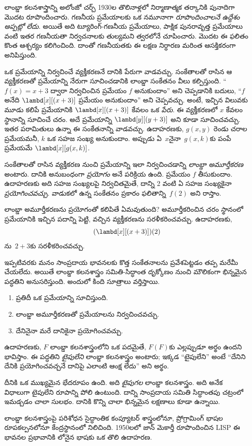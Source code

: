 \documentclass[../../../include/open-logic-section]{subfiles}
\begin{document}

లాంబ్డా కలనశాస్త్రాన్ని అలోంజో చర్చ్ 1930ల తొలినాళ్లలో నిర్మాణాత్మక
తర్కానికి పునాదిగా మొదట రూపొందించారు. గణనీయ ప్రమేయాలకు ఒక నమూనాగా
\emph{రూపొందించాలనే ఉద్దేశం అప్పట్లో లేదు}. అయితే అది ట్యూరింగ్-గణనీయ
ప్రమేయాలు, పాక్షిక పునరావృత్త ప్రమేయాలు వంటి ఇతర గణనీయతా నిర్వచనాలకు
తుల్యమని త్వరలోనే చూపించారు. మొదట ఈ ఫలితం కొంత ఆశ్చర్యం కలిగించింది.
దాంతో గణనీయతకు ఈ లక్షణ నిర్ధారణ మరింత ఆసక్తికరంగా అనిపిస్తుంది.

ఒక ప్రమేయాన్ని నిర్వచించే వ్యక్తీకరణనే దానికి పేరుగా వాడవచ్చు.
సంకేతాలతో రాసిన ఆ వ్యక్తీకరణతో ప్రమేయాన్ని నేరుగా సూచించడానికి
లాంబ్డా సంకేతనం వీలు కల్పిస్తుంది. ``$f(x) = x + 3$ ద్వారా నిర్వచించిన ప్రమేయం $f$ అనుకుందాం''
అని చెప్పడానికి బదులు, ``$f$ అనేది $\lambd[x][(x + 3)]$ ప్రమేయం
అనుకుందాం'' అని చెప్పవచ్చు. అంటే, ఇచ్చిన విలువకు మూడు కలిపే ప్రమేయానికి $\lambd[x][(x+3)]$ కేవలం ఒక \emph{పేరు}.
ఈ వ్యక్తీకరణలో $x$ కేవలం స్థానాన్ని సూచించే చరం. అదే
ప్రమేయాన్ని $\lambd[y][(y + 3)]$ అని కూడా
సూచించవచ్చు. ఇతర పరామితులు ఉన్నా ఈ సంకేతనాన్ని వాడవచ్చు. ఉదాహరణకు, $g(x, y)$ రెండు చరాల ప్రమేయమనీ,
$k$ ఒక సహజ సంఖ్య అనుకుందాం. అప్పుడు ఏ~$x$నైనా~$g(x, k)$కు
పంపే ప్రమేయమే $\lambd[x][g(x,k)]$.

సంకేతాలతో రాసిన వ్యక్తీకరణ నుంచి ప్రమేయాన్ని ఇలా నిర్వచించడాన్ని
\emph{లాంబ్డా అమూర్తీకరణ} అంటారు. దానికి అనుబంధంగా \emph{ప్రయోగం}
అనే పరిక్రియ ఉంది. ప్రమేయం $f$ తీసుకుందాం. ఉదాహరణకు అది సహజ సంఖ్యలపై
నిర్వచితమైతే, దాన్ని 2 వంటి ఏ సహజ సంఖ్యకైనా \emph{ప్రయోగించవచ్చు}.
వాడుకలో ఉన్న సంకేతనం ప్రకారం ఫలితాన్ని~$f(2)$ అని రాస్తాం.

లాంబ్డా అమూర్తీకరణను ప్రయోగంతో కలిపితే ఏమవుతుంది? అమూర్తీకరించిన
చరం స్థానంలో ప్రమేయానికి ఇచ్చిన పదాన్ని పెట్టి, వచ్చిన
వ్యక్తీకరణను సరళీకరించవచ్చు. ఉదాహరణకు,
\[
(\lambd[x][(x + 3)])(2)
\]
ను~$2 + 3$కు సరళీకరించవచ్చు.

ఇప్పటివరకు మనం సాంప్రదాయ భావనలకు కొత్త సంకేతనాలను ప్రవేశపెట్టడం తప్ప
మరేమీ చేయలేదు. అయితే లాంబ్డా కలనశాస్త్రం సమితి-సిద్ధాంత దృక్కోణం నుంచి
మౌలికంగా భిన్నమైన పద్ధతిని అనుసరిస్తుంది. అందులో కింది సూత్రాలు వర్తిస్తాయి.
\begin{enumerate}
\item ప్రతిదీ ఒక ప్రమేయాన్ని సూచిస్తుంది.
\item లాంబ్డా అమూర్తీకరణతో ప్రమేయాలను నిర్వచించవచ్చు.
\item దేనినైనా మరే దానికైనా ప్రయోగించవచ్చు.
\end{enumerate}
ఉదాహరణకు, $F$ లాంబ్డా కలనశాస్త్రంలోని ఒక పదమైతే, $F(F)$కు ఎల్లప్పుడూ
అర్థం ఉందని భావిస్తాం. ఈ పద్ధతిని \emph{టైపులేని} లాంబ్డా
కలనశాస్త్రం అంటారు; ఇక్కడ ``టైపులేని'' అంటే ``దేనిని దేనికి
ప్రయోగించవచ్చనే దానిపై ఎలాంటి ఆంక్ష లేదు'' అని అర్థం.

\begin{digress}
దీనికి ఒక ముఖ్యమైన భేదరూపం ఉంది. అది \emph{టైపుగల} లాంబ్డా
కలనశాస్త్రం. అది అనేక విధాలుగా టైపులేని రూపాన్ని పోలి ఉంటుంది.
దాన్ని సాంప్రదాయ సమితి సిద్ధాంతపు చట్రంలో ఇమడ్చడం చాలా సులభం.
దానికి కొన్ని చాలా భిన్నమైన లక్షణాలు కూడా ఉన్నాయి.

లాంబ్డా కలనశాస్త్రంపై పరిశోధన సైద్ధాంతిక కంప్యూటర్ శాస్త్రంలోనూ,
ప్రోగ్రామింగ్ భాషల రూపకల్పనలోనూ కేంద్రస్థానంలో నిలిచింది. 1950లలో
జాన్ మెకార్తీ రూపొందించిన LISP ఈ భావనల ప్రభావానికి లోనైన భాషకు ఒక
తొలి ఉదాహరణ.
\end{digress}
\end{document}
